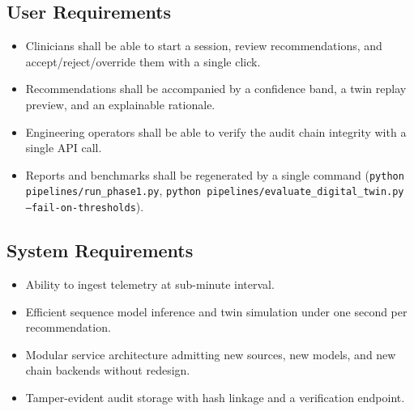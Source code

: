 \documentclass[12pt,a4paper,oneside]{report}
\begin{document}
\subsection{User Requirements}
\begin{itemize}[leftmargin=*]
  \item Clinicians shall be able to start a session, review recommendations, and accept/reject/override them with a single click.
  \item Recommendations shall be accompanied by a confidence band, a twin replay preview, and an explainable rationale.
  \item Engineering operators shall be able to verify the audit chain integrity with a single API call.
  \item Reports and benchmarks shall be regenerated by a single command (\texttt{python pipelines/run\_phase1.py}, \texttt{python pipelines/evaluate\_digital\_twin.py --fail-on-thresholds}).
\end{itemize}

\subsection{System Requirements}
\begin{itemize}[leftmargin=*]
  \item Ability to ingest telemetry at sub-minute interval.
  \item Efficient sequence model inference and twin simulation under one second per recommendation.
  \item Modular service architecture admitting new sources, new models, and new chain backends without redesign.
  \item Tamper-evident audit storage with hash linkage and a verification endpoint.
\end{itemize}
\end{document}
